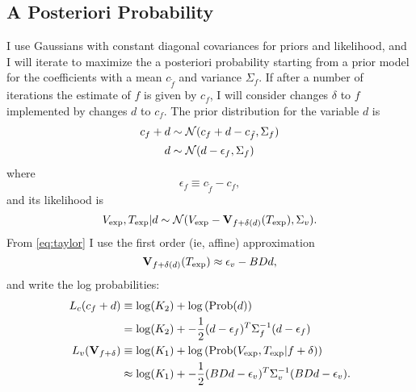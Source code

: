\documentclass[11pt]{article}
\newcommand{\normal}[2]{{\cal N}(#1,#2)}
\newcommand{\normalexp}[3]{ -\frac{1}{2}
      (#1 - #2)^T #3^{-1} (#1 - #2) }
\newcommand{\fnom}{\tilde f}
\newcommand{\Prob}{\text{Prob}}
\newcommand\Vt{\mathbf{V}}
\newcommand\vexp{V_{\rm{exp}}}
\newcommand\texp{T_{\rm{exp}}}
\newcommand\cf{c_f}
\newcommand\epv{\epsilon_v}
\newcommand\epf{\epsilon_f}
\begin{document}
\subsection{A Posteriori Probability}
\label{sec:app}

I use Gaussians with constant diagonal covariances for priors and
likelihood, and I will iterate to maximize the a posteriori
probability starting from a prior model for the coefficients with a
mean $c_{\fnom}$ and variance $\Sigma_f$.  If after a number of
iterations the estimate of $f$ is given by $c_f$, I will consider
changes $\delta$ to $f$ implemented by changes $d$ to $c_f$.  The
prior distribution for the variable $d$ is
\begin{align}
  \cf+d &\sim \normal{\cf+d - c_{\fnom}}{\Sigma_f} \nonumber \\
  \label{eq:priord}
  d &\sim \normal{d - \epf}{\Sigma_f}
\end{align}
where
\begin{equation}
  \label{eq:epf}
  \epf \equiv c_{\fnom} - c_f,
\end{equation}
and its likelihood is
\begin{equation}
  \label{eq:liked}
  \vexp,\texp | d \sim
  \normal{\vexp-\Vt_{f+\delta(d)}(\texp)}{\Sigma_v}.
\end{equation}
From \eqref{eq:taylor} I use the first order (ie, affine)
approximation
\begin{equation*}
  \Vt_{f+\delta(d)}(\texp) \approx \epv - BDd,
\end{equation*}
and write the log probabilities:
\begin{align}
  L_c(\cf+d) & \equiv \log(K_2) + \log \left(\Prob(d) \right)\nonumber\\
  \label{eq:L_c}
  & = \log(K_2) + \normalexp{d}{\epf}{\Sigma_f}\\
  L_v(\Vt_{f+\delta}) & \equiv \log(K_1) + \log
  \left(\Prob(\vexp,\texp | f+\delta) \right) \nonumber\\
  \label{eq:L_v}
  &\approx \log(K_1) + \normalexp{BDd}{\epv}{\Sigma_v}.
\end{align}
\end{document}
